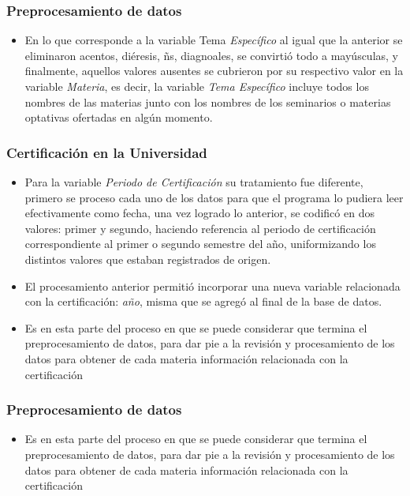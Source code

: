 \documentclass[xcolor=dvipsnames]{beamer}
\begin{document}
\begin{frame}\frametitle{Preprocesamiento de datos}
\begin{itemize}

\item En lo que corresponde a la variable Tema \textit{Espec\'ifico} al igual que la anterior se eliminaron acentos, di\'eresis, \~ns, diagnoales, se convirti\'o todo a may\'usculas, y finalmente, aquellos valores ausentes se cubrieron por su respectivo valor en la variable \textit{Materia}, es decir, la variable \textit{Tema Espec\'ifico} incluye todos los nombres de las materias junto con los nombres de los seminarios o materias optativas ofertadas en alg\'un momento.
 

\end{itemize}
\end{frame}


\begin{frame}\frametitle{Certificaci\'on en la Universidad}
\begin{itemize}

\item Para la variable \textit{Periodo de Certificaci\'on} su tratamiento fue diferente, primero se proceso cada uno de los datos para que el programa lo pudiera leer efectivamente como fecha, una vez logrado lo anterior, se codific\'o en dos valores: primer y segundo, haciendo referencia al periodo de certificaci\'on correspondiente al primer o segundo semestre del a\~no, uniformizando los distintos valores que estaban registrados de origen. 

\item El procesamiento anterior permiti\'o incorporar una nueva variable relacionada con la certificaci\'on: \textit{a\~no}, misma que se agreg\'o al final de la base de datos.


\item Es en esta parte del proceso en que se puede considerar que termina el preprocesamiento de datos, para dar pie a la revisi\'on y procesamiento de los datos para obtener de cada materia informaci\'on  relacionada con la certificaci\'on
\end{itemize}

\end{frame}


\begin{frame}\frametitle{Preprocesamiento de datos}
\begin{itemize}

\item Es en esta parte del proceso en que se puede considerar que termina el preprocesamiento de datos, para dar pie a la revisi\'on y procesamiento de los datos para obtener de cada materia informaci\'on  relacionada con la certificaci\'on
\end{itemize}

\end{frame}
\end{document}
